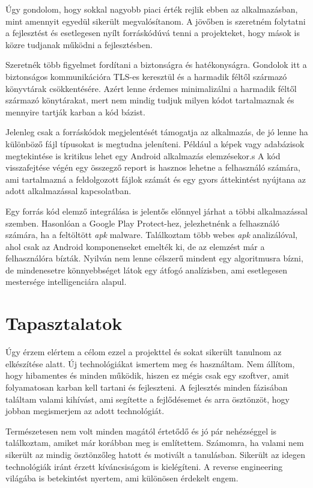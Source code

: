 \documentclass{thesis-ekf}
\theoremstyle{definition}
\theoremstyle{remark}
\begin{document}
Úgy gondolom, hogy sokkal nagyobb piaci érték rejlik ebben az alkalmazásban, mint amennyit egyedül sikerült megvalósítanom.
A jövőben is szeretném folytatni a fejlesztést és esetlegesen nyílt forráskódúvá tenni a projekteket, hogy mások is közre tudjanak működni a fejlesztésben.

Szeretnék több figyelmet fordítani a biztonságra és hatékonyságra. 
Gondolok itt a biztonságos kommunikációra TLS-es keresztül és a harmadik féltől származó könyvtárak csökkentésére.
Azért lenne érdemes minimalizálni a harmadik féltől származó könytárakat, mert nem mindig tudjuk milyen kódot tartalmaznak és mennyire tartják karban a kód bázist.

Jelenleg csak a forráskódok megjelentését támogatja az alkalmazás, de jó lenne ha különböző fájl típusokat is megtudna jeleníteni.
Például a képek vagy adabázisok megtekintése is kritikus lehet egy Android alkalmazás elemzésekor.s
A kód visszafejtése végén egy összegző report is hasznos lehetne a felhasználó számára, ami tartalmazná a feldolgozott fájlok számát és egy gyors áttekintést nyújtana az adott alkalmazással kapcsolatban.

Egy forrás kód elemző integrálása is jelentős előnnyel járhat a többi alkalmazással szemben. Hasonlóan a Google Play Protect-hez, jelezhetnénk a felhasználó számára, ha a feltöltött \emph{apk} malware.
Találkoztam több webes \emph{apk} analizálóval, ahol csak az Android komponenseket emelték ki, de az elemzést már a felhasználóra bízták.
Nyilván nem lenne célszerű mindent egy algoritmusra bízni, de mindenesetre könnyebbséget látok egy átfogó analízisben, ami esetlegesen mestersége intelligenciára alapul.

\chapter{Tapasztalatok}\label{tapasztalatok}

Úgy érzem elértem a célom ezzel a projekttel és sokat sikerült tanulnom az elkészítése alatt.
Új technológiákat ismertem meg és használtam. Nem állítom, hogy hibamentes és minden működik, hiszen ez mégis csak egy szoftver, amit folyamatosan karban kell tartani és fejleszteni.
A fejlesztés minden fázisában találtam valami kihívást, ami segítette a fejlődésemet és arra ösztönzöt, hogy jobban megismerjem az adott technológiát.

Természetesen nem volt minden magától értetődő és jó pár nehézséggel is találkoztam, amiket már korábban meg is említettem.
Számomra, ha valami nem sikerült az mindig ösztönzőleg hatott és motivált a tanulásban. Sikerült az idegen technológiák iránt érzett kíváncsiságom is kielégíteni.
A reverse engineering világába is betekintést nyertem, ami különösen érdekelt engem. 
\end{document}
